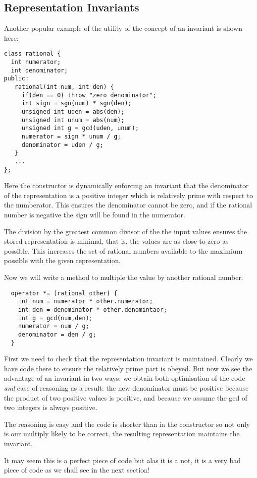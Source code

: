 \documentclass[oneside]{book}
\begin{document}
\subsection{Representation Invariants}
Another popular example of the utility of the concept of an invariant
is shown here:
\begin{verbatim}
class rational {
  int numerator;
  int denominator;
public:
   rational(int num, int den) {
     if(den == 0) throw "zero denominator";
     int sign = sgn(num) * sgn(den);
     unsigned int uden = abs(den);
     unsigned int unum = abs(num);
     unsigned int g = gcd(uden, unum);
     numerator = sign * unum / g;
     denominator = uden / g;
   }
   ...
};
\end{verbatim}
Here the constructor is dynamically enforcing an invariant that
the denominator of the representation is a positive integer
which is relatively prime with respect to the numberator.
This ensures the denominator cannot be zero, and if the rational
number is negative the sign will be found in the numerator.

The division by the greatest common divisor of the the input
values ensures the stored representation is minimal, that is,
the values are as close to zero as possible. This increases the
set of rational numbers available to the maximium possible
with the given representation.

Now we will write a method to multiple the value by another rational
number:

\begin{verbatim}
  operator *= (rational other) { 
    int num = numerator * other.numerator;
    int den = denominator * other.denomintaor;
    int g = gcd(num,den);
    numerator = num / g;
    denominator = den / g;
  }
\end{verbatim}
First we need to check that the representation invariant is maintained.
Clearly we have code there to ensure the relatively prime part is obeyed.
But now we see the advantage of an invariant in two ways: we obtain
both optimisation of the code {\em and} ease of reasoning as a result:
the new denominator must be positive because the product of two positive
values is positive, and because we assume the gcd of two integers is always
positive.

The reasoning is easy and the code is shorter than in the constructor
so not only is our multiply likely to be correct, the resulting representation
maintains the invariant.

It may seem this is a perfect piece of code but alas it is a not,
it is a very bad piece of code as we shall see in the next section!
\end{document}
